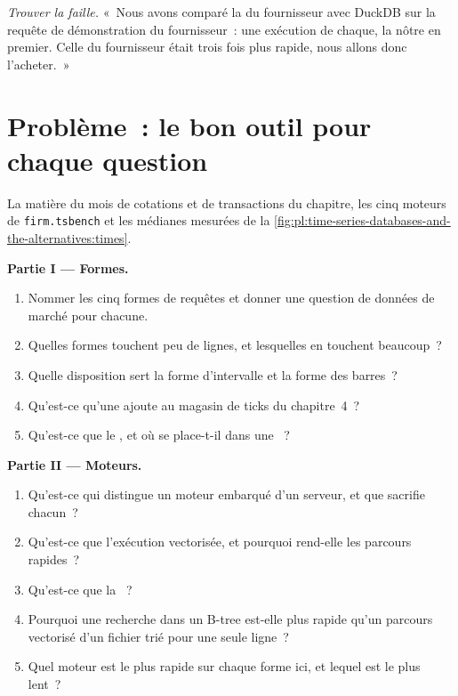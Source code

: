 \begin{exercise}[$\star\star\star$]\label{exo:pl:time-series-databases-and-the-alternatives:8}
\emph{Trouver la faille.} «~Nous avons comparé la  du fournisseur avec DuckDB sur la requête de démonstration du fournisseur~: une exécution de
chaque, la nôtre en premier. Celle du fournisseur était trois fois plus rapide, nous allons donc l'acheter.~»
\end{exercise}

\section{Problème~: le bon outil pour chaque question}

\begin{problem}\label{pb:pl:time-series-databases-and-the-alternatives:1}
La matière du mois de cotations et de transactions du chapitre, les cinq moteurs de \texttt{firm.tsbench} et les médianes mesurées de
la \cref{fig:pl:time-series-databases-and-the-alternatives:times}.

\medskip\noindent\textbf{Partie I --- Formes.}
\begin{enumerate}
\item Nommer les cinq formes de requêtes et donner une question de données de marché pour chacune.
\item Quelles formes touchent peu de lignes, et lesquelles en touchent beaucoup~?
\item Quelle disposition sert la forme d'intervalle et la forme des barres~?
\item Qu'est-ce qu'une  ajoute au magasin de ticks du chapitre~4~?
\item Qu'est-ce que le , et où se place-t-il dans une ~?
\end{enumerate}

\medskip\noindent\textbf{Partie II --- Moteurs.}
\begin{enumerate}[resume]
\item Qu'est-ce qui distingue un moteur embarqué d'un serveur, et que sacrifie chacun~?
\item Qu'est-ce que l'exécution vectorisée, et pourquoi rend-elle les parcours rapides~?
\item Qu'est-ce que la ~?
\item Pourquoi une recherche dans un B-tree est-elle plus rapide qu'un parcours vectorisé d'un fichier trié pour une seule ligne~?
\item Quel moteur est le plus rapide sur chaque forme ici, et lequel est le plus lent~?
\end{enumerate}


\end{problem}
